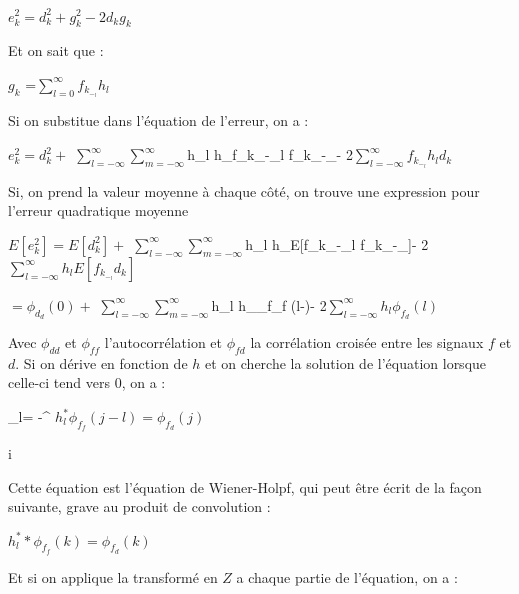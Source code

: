 \documentclass[conference,onecolumn]{IEEEtran}
\begin{document}
\begin{center}
    $e_k^2=d_k^2+g_k^2-2d_kg_k$
\end{center}{}
    

Et on sait que :

\begin{center}
     $g_k$ =$\displaystyle\sum_{l=0}^{\infty}f_k_-_l h_l $
\end{center}


Si on substitue dans l’équation de l’erreur, on a :

\begin{center}
    $e_k^2=d_k^2+$ $\displaystyle \sum_{l=-\infty}^{\infty}\displaystyle\sum_{m=-\infty}^{\infty}$h_l h_\mu f_k_-_l f_k_-_\mu$ $- 2$  \displaystyle\sum_{l= -\infty}^{\infty}f_k_-_l h_l d_k$
\end{center}

Si, on prend la valeur moyenne à chaque côté, on trouve une expression pour l’erreur quadratique moyenne 

\begin{center}
     $E[e_k^2]=E[d_k^2]+$ $\displaystyle \sum_{l=-\infty}^{\infty}\displaystyle\sum_{m=-\infty}^{\infty}$h_l h_\mu E[f_k_-_l f_k_-_\mu]$ $- 2$  \displaystyle\sum_{l= -\infty}^{\infty}h_l E[f_k_-_l  d_k]$
\end{center}
\begin{center}
        $= \phi_d_d (0) + $ $\displaystyle \sum_{l=-\infty}^{\infty}\displaystyle\sum_{m=-\infty}^{\infty} $h_l h_\mu \phi_f_f (l-\mu)$  $- 2$  \displaystyle\sum_{l= -\infty}^{\infty} h_l \phi_f_d(l)$
\end{center}

Avec $\phi_{dd}$ et $\phi_{ff}$ l’autocorrélation et $\phi_{fd}$ la corrélation croisée entre les signaux $f$ et $d$. Si on dérive en fonction de $h$ et on cherche la solution de l’équation lorsque celle-ci tend vers $0$, on a :

\begin{center}
     \displaystyle\sum_{l= -\infty}^{\infty} $h_l^* \phi_f_f (j-l)=\phi_f_d(j)$
\end{center}i

Cette équation est l’équation de Wiener-Holpf, qui peut être écrit de la façon suivante, grave au produit de convolution :

\begin{center}
     $h_l^* * \phi_f_f (k) = \phi_f_d (k)$
\end{center}
Et si on applique la transformé en $Z$ a chaque partie de l’équation, on a :
\end{document}
